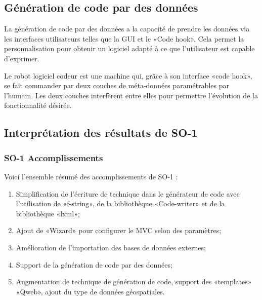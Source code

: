 \subsection{Génération de code par des données}

La génération de code par des données a la capacité de prendre les données via les interfaces utilisateurs telles que la GUI et le «Code hook». Cela permet la personnalisation pour obtenir un logiciel adapté à ce que l’utilisateur est capable d’exprimer.

Le robot logiciel codeur est une machine qui, grâce à son interface «code hook», se fait commander par deux couches de méta-données paramétrables par l’humain. Les deux couches interfèrent entre elles pour permettre l’évolution de la fonctionnalité désirée.


\subsection{Interprétation des résultats de SO-1}

\subsubsection{SO-1 Accomplissements}
Voici l'ensemble résumé des accomplissements de SO-1 :
\begin{enumerate}
    \item Simplification de l’écriture de technique dans le générateur de code avec l’utilisation de «f-string», de la bibliothèque «Code-writer» et de la bibliothèque «lxml»;
    \item Ajout de «Wizard» pour configurer le MVC selon des paramètres;
    \item Amélioration de l’importation des bases de données externes;
    \item Support de la génération de code par des données;
    \item Augmentation de technique de génération de code, support des «templates» «Qweb», ajout du type de données géospatiales.
\end{enumerate}

